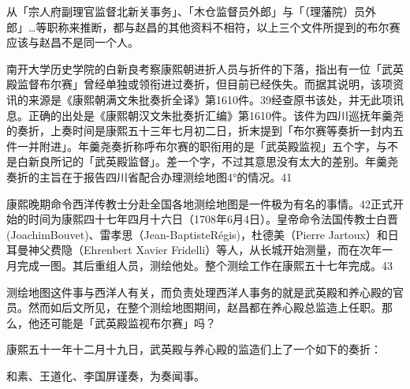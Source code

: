 从「宗人府副理官监督北新关事务」、「木仓监督员外郎」与「（理藩院）员外郎」…等职称来推断，都与赵昌的其他资料不相符，以上三个文件所提到的布尔赛应该与赵昌不是同一个人。

\vfill
\begin{BookNotes}
\end{BookNotes}

南开大学历史学院的白新良考察康熙朝进折人员与折件的下落，指出有一位「武英殿监督布尔赛」曾经单独或领衔进过奏折，但目前已经佚失。而据其说明，该项资讯的来源是《康熙朝满文朱批奏折全译》第1610件。39经查原书该处，并无此项讯息。正确的出处是《康熙朝汉文朱批奏折汇编》第1610件。该件为四川巡抚年羹尧的奏折，上奏时间是康熙五十三年七月初二日，折末提到「布尔赛等奏折一封内五件一并附进」。年羹尧奏折称呼布尔赛的职衔用的是「武英殿监视」五个字，与不是白新良所记的「武英殿监督」。差一个字，不过其意思没有太大的差别。年羹尧奏折的主旨在于报告四川省配合办理测绘地图4°的情况。41

康熙晚期命令西洋传教士分赴全国各地测绘地图是一件极为有名的事情。42正式开始的时间为康熙四十七年四月十六日（1708年6月4日）。皇帝命令法国传教士白晋(JoachimBouvet)、雷孝思（Jean-BaptisteRégis)，杜德美（Pierre Jartoux）和日耳曼神父费隐（Ehrenbert Xavier Fridelli）等人，从长城开始测量，而在次年一月完成一图。其后重组人员，测绘他处。整个测绘工作在康熙五十七年完成。43

测绘地图这件事与西洋人有关，而负责处理西洋人事务的就是武英殿和养心殿的官员。然而如后文所见，在整个测绘地图期间，赵昌都在养心殿总监造上任职。那么，他还可能是「武英殿监视布尔赛」吗？

康熙五十一年十二月十九日，武英殿与养心殿的监造们上了一个如下的奏折：

\begin{BookQuote}
和素、王道化、李国屏谨奏，为奏闻事。
\end{BookQuote}

\vfill
\begin{BookNotes}
\end{BookNotes}

